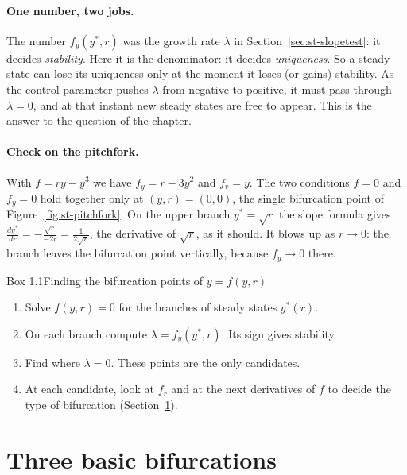 \paragraph{One number, two jobs.}
The number $f_y(y^*,r)$ was the growth rate $\lambda$ in
Section~\ref{sec:st-slopetest}: it decides \emph{stability}. Here it is the
denominator: it decides \emph{uniqueness}. So a steady state can lose its
uniqueness only at the moment it loses (or gains) stability. As the control
parameter pushes $\lambda$ from negative to positive, it must pass through
$\lambda = 0$, and at that instant new steady states are free to appear. This is
the answer to the question of the chapter.

\paragraph{Check on the pitchfork.}
With $f = ry - y^3$ we have $f_y = r - 3y^2$ and $f_r = y$. The two conditions
$f = 0$ and $f_y = 0$ hold together only at $(y,r) = (0,0)$, the single
bifurcation point of Figure~\ref{fig:st-pitchfork}. On the upper branch
$y^* = \sqrt r$ the slope formula gives
$\displaystyle\frac{dy^*}{dr} = -\frac{\sqrt r}{-2r} = \frac{1}{2\sqrt r}$, the
derivative of $\sqrt r$, as it should. It blows up as $r \to 0$: the branch leaves
the bifurcation point vertically, because $f_y \to 0$ there.

\begin{gbox}{Box 1.1\quad Finding the bifurcation points of $\dot y = f(y,r)$}\label{sec:st-box-bif}
%
\begin{enumerate}[label=\arabic*.]
  \item Solve $f(y,r) = 0$ for the branches of steady states $y^*(r)$.
  \item On each branch compute $\lambda = f_y(y^*,r)$. Its sign gives stability.
  \item Find where $\lambda = 0$. These points are the only candidates.
  \item At each candidate, look at $f_r$ and at the next derivatives of $f$ to
        decide the type of bifurcation (Section~\ref{sec:st-normal}).
\end{enumerate}
\end{gbox}

\section{Three basic bifurcations}\label{sec:st-normal}
%

